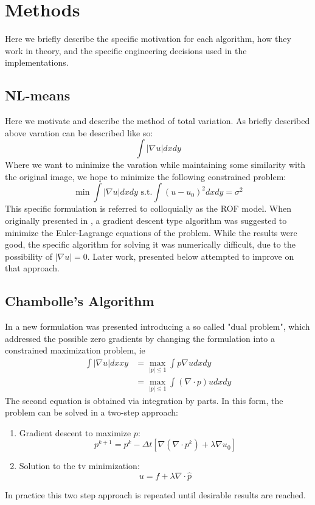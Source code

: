\documentclass[11pt]{article}
\begin{document}
\section{Methods}
Here we briefly describe the specific motivation for each algorithm, how they work in theory, and the specific engineering decisions used in the implementations.
\subsection{NL-means}
Here we motivate and describe the method of total variation.
As briefly described above varation can be described like so:
\begin{equation*}
\int |\nabla u| dx dy
\end{equation*}
Where we want to minimize the varation while maintaining some similarity with the original image, we hope to minimize the following constrained problem:
\begin{equation}
\min \int |\nabla u| dx dy \text{ s.t.} \int (u-u_0)^2 dxdy = \sigma^2
\label{tv:isotropic}
\end{equation}
This specific formulation is referred to colloquially as the ROF model.
When originally presented in \cite{rudin1992nonlinear}, a gradient descent type algorithm was suggested to minimize the Euler-Lagrange equations of the problem.
While the results were good, the specific algorithm for solving it was numerically difficult, due to the possibility of $|\nabla u|=0$.
Later work, presented below attempted to improve on that approach.

\subsection{Chambolle's Algorithm}
In \cite{chambolle2004algorithm} a new formulation was presented introducing a so called "dual problem", which addressed the possible zero gradients by changing the formulation into a constrained maximization problem, ie
\begin{align*}
\int |\nabla u| dx xy &= \max_{|p| \le 1} \int p \nabla u dx dy \\
&= \max_{|p| \le 1} \int (\nabla \cdot p) u dx dy
\end{align*}
The second equation is obtained via integration by parts.  
In this form, the problem can be solved in a two-step approach:
\begin{enumerate}
\item
Gradient descent to maximize $p$:
\begin{equation}
p^{k+1} = p^{k} - \Delta t \left[ \nabla( \nabla \cdot p^{k}) + \lambda \nabla u_0 \right]
\label{ch:dual}
\end{equation}
\item Solution to the tv minimization:
\begin{equation}
u = f + \lambda \nabla \cdot \hat{p}
\label{ch:primal}
\end{equation}
\end{enumerate}
In practice this two step approach is repeated until desirable results are reached.
\end{document}
